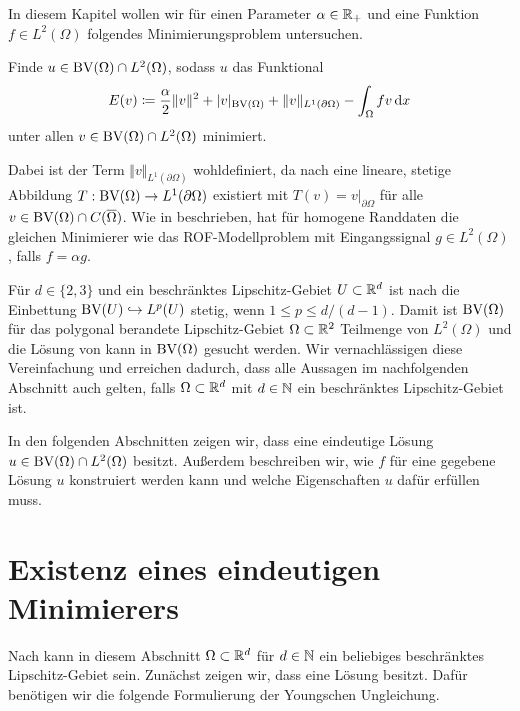 In diesem Kapitel wollen wir für einen Parameter $\alpha\in\mathbb{R}_+$ und eine
Funktion $f\in L^2(\Omega)$ folgendes Minimierungsproblem untersuchen.

\begin{problem}\label{prob:continuousProblem}
  Finde $u\in \textup{BV}(\Omega)\cap L^2(\Omega)$, sodass
  $u$ das Funktional
  \begin{align}\label{eq:continuousProblem}
    E(v)\coloneqq \frac{\alpha}{2}\Vert v\Vert^2 + |v|_{\textup{BV}(\Omega)}
    +\Vert v\Vert_{L^1(\partial\Omega)}-\int_\Omega fv\,\mathrm{d}x
  \end{align}
  unter allen $v\in\textup{BV}(\Omega)\cap L^2(\Omega)$ minimiert.
\end{problem}
Dabei ist der Term $\Vert v\Vert_{L^1(\partial\Omega)}$ wohldefiniert, da
nach \cite[S. 400, Theorem 10.2.1]{ABM14} eine lineare, stetige Abbildung
$T:\textup{BV}(\Omega)\to L^1(\partial\Omega)$ existiert mit $T(v) =
v|_{\partial\Omega}$ für alle $v\in\textup{BV}(\Omega)\cap C(\overline\Omega)$.
Wie in  beschrieben, hat 
für homogene Randdaten die gleichen Minimierer wie das ROF-Modellproblem mit
Eingangssignal $g\in L^2(\Omega)$, falls $f=\alpha g$.

\begin{remark}
  \label{rem:embedding}
  Für $d\in\{2,3\}$ und ein beschränktes Lipschitz-Gebiet $U\subset\mathbb{R}^d$ ist
  nach \cite[S. 302, Remark 10.5 (i)]{Bar15} die Einbettung
  $\textup{BV}(U)\hookrightarrow L^p(U)$ stetig, wenn $1\leq p\leq d/(d-1)$. 
  Damit ist $\textup{BV}(\Omega)$ für das polygonal berandete Lipschitz-Gebiet
  $\Omega\subset \mathbb{R}^2$ Teilmenge von $L^2(\Omega)$ und die Lösung von
   kann in $\textup{BV}(\Omega)$ gesucht werden. 
  Wir vernachlässigen diese Vereinfachung und erreichen dadurch, dass alle
  Aussagen im nachfolgenden Abschnitt auch gelten, falls $\Omega\subset\mathbb{R}^d$
  mit $d\in\mathbb{N}$ ein beschränktes Lipschitz-Gebiet ist.
\end{remark}

In den folgenden Abschnitten zeigen wir, dass
 eine eindeutige Lösung $u\in\textup{BV}(\Omega)\cap
L^2(\Omega)$ besitzt. 
Außerdem beschreiben wir, wie $f$ für eine gegebene Lösung $u$ konstruiert
werden kann und welche Eigenschaften $u$ dafür erfüllen muss.


\section{Existenz eines eindeutigen Minimierers}
Nach  kann in diesem Abschnitt $\Omega\subset\mathbb{R}^d$ für
$d\in\mathbb{N}$ ein beliebiges beschränktes Lipschitz-Gebiet sein.
Zunächst zeigen wir, dass  eine Lösung besitzt.
Dafür benötigen wir die folgende Formulierung der Youngschen Ungleichung.

